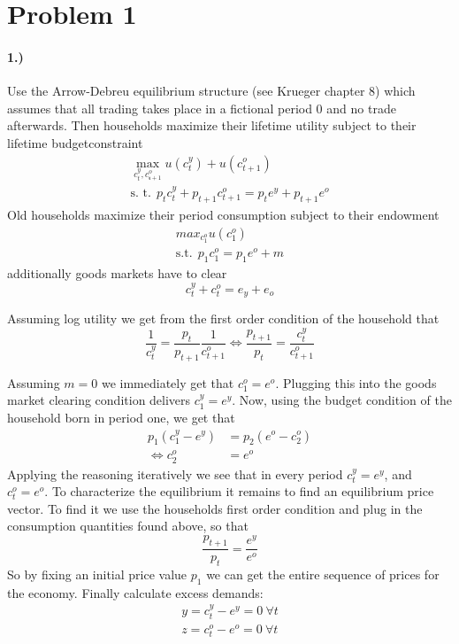 
\section*{Problem 1}

\paragraph{1.)}
Use the Arrow-Debreu equilibrium structure (see Krueger chapter 8) which
assumes that all trading takes place in a fictional period 0 and no trade
afterwards. Then households maximize their lifetime utility subject to their
lifetime budgetconstraint
\begin{align*}
  \max_{c_t^y, c_{ŧ+1}^o} u\left(c_t^y\right) + u\left(c_{t+1}^o\right) \\
  \text{s. t.}~~p_t c_t^y + p_{t+1} c_{t+1}^o = p_t e^y + p_{t+1} e^o
\end{align*}
Old households maximize their period consumption subject to their endowment
\begin{align*}
  max_{c_1^o} u\left(c_1^o\right) \\
  \text{s.t.}~~p_1 c_1^o = p_1 e^o + m
\end{align*}
additionally goods markets have to clear
\begin{equation*}
  c_t^y + c_t^o = e_y + e_o
\end{equation*}

Assuming log utility we get from the first order condition of the household
that 
\begin{equation*}
  \frac{1}{c_t^y} = \frac{p_t}{p_{t+1}} \frac{1}{c_{t+1}^o} \iff
  \frac{p_{t+1}}{p_t} = \frac{c_t^y}{c_{t+1}^o}
\end{equation*}

Assuming $m = 0$ we immediately get that $c_1^o = e^o$. Plugging this into the
goods market clearing condition delivers $c_1^y = e^y$. Now, using the budget
condition of the household born in period one, we get that 
\begin{align*}
  p_1 \left(c_1^y - e^y\right) &= p_2 \left(e^o - c_2^o\right) \\
  \iff c_2^o &= e^o
\end{align*}
Applying the reasoning iteratively we see that in every period $c_t^y = e^y$,
and $c_t^o = e^o$. To characterize the equilibrium it remains to find an
equilibrium price vector. To find it we use the households first order
condition and plug in the consumption quantities found above, so that
\begin{equation*}
  \frac{p_{t+1}}{p_t} = \frac{e^y}{e^o}
\end{equation*}
So by fixing an initial price value $p_1$ we can get the entire sequence of
prices for the economy.
Finally calculate excess demands:
\begin{align*}
  y = c_t^y - e^y = 0~\forall t\\
  z = c_t^o - e^o = 0~\forall t
\end{align*}

